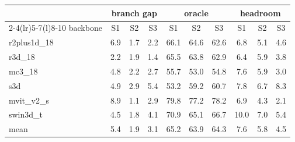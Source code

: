 \begin{tabular}{@{}l ccc ccc ccc@{}}\toprule
 & \multicolumn{3}{c}{branch gap} & \multicolumn{3}{c}{oracle} & \multicolumn{3}{c}{headroom}\\
\cmidrule(lr){2-4}\cmidrule(lr){5-7}\cmidrule(l){8-10}
backbone & S1 & S2 & S3 & S1 & S2 & S3 & S1 & S2 & S3\\\midrule
r2plus1d\_18 & 6.9 & 1.7 & 2.2 & 66.1 & 64.6 & 62.6 & 6.8 & 5.1 & 4.6\\
r3d\_18 & 2.2 & 1.9 & 1.4 & 65.5 & 63.8 & 62.9 & 6.4 & 5.9 & 3.8\\
mc3\_18 & 4.8 & 2.2 & 2.7 & 55.7 & 53.0 & 54.8 & 7.6 & 5.9 & 3.0\\
s3d & 4.9 & 2.9 & 5.4 & 53.2 & 59.2 & 60.7 & 7.8 & 6.7 & 8.3\\
mvit\_v2\_s & 8.9 & 1.1 & 2.9 & 79.8 & 77.2 & 78.2 & 6.9 & 4.3 & 2.1\\
swin3d\_t & 4.5 & 1.8 & 4.1 & 70.9 & 65.1 & 66.7 & 10.0 & 7.0 & 5.4\\
\midrule
mean & 5.4 & 1.9 & 3.1 & 65.2 & 63.9 & 64.3 & 7.6 & 5.8 & 4.5\\
\bottomrule\end{tabular}